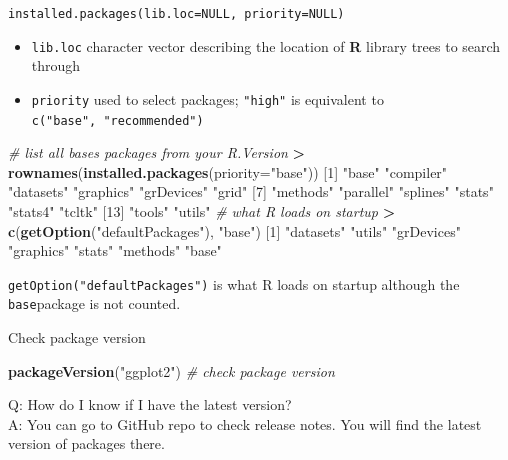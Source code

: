 \documentclass[
]{book}
\newenvironment{Shaded}{\begin{snugshade}}{\end{snugshade}}
\newcommand{\AttributeTok}[1]{\textcolor[rgb]{0.13,0.29,0.53}{#1}}
\newcommand{\CommentTok}[1]{\textcolor[rgb]{0.56,0.35,0.01}{\textit{#1}}}
\newcommand{\DecValTok}[1]{\textcolor[rgb]{0.00,0.00,0.81}{#1}}
\newcommand{\FunctionTok}[1]{\textcolor[rgb]{0.13,0.29,0.53}{\textbf{#1}}}
\newcommand{\NormalTok}[1]{#1}
\newcommand{\SpecialCharTok}[1]{\textcolor[rgb]{0.81,0.36,0.00}{\textbf{#1}}}
\newcommand{\StringTok}[1]{\textcolor[rgb]{0.31,0.60,0.02}{#1}}
\providecommand{\tightlist}{%
  \setlength{\itemsep}{0pt}\setlength{\parskip}{0pt}}
\theoremstyle{definition}
\theoremstyle{definition}
\theoremstyle{definition}
\theoremstyle{definition}
\theoremstyle{remark}
\begin{document}
\texttt{installed.packages(lib.loc=NULL,\ priority=NULL)}

\begin{itemize}
\tightlist
\item
  \texttt{lib.loc} character vector describing the location of \textbf{R} library trees to search through
\item
  \texttt{priority} used to select packages; \texttt{"high"} is equivalent to \texttt{c("base",\ "recommended")}
\end{itemize}

\begin{Shaded}
\begin{Highlighting}[]
\CommentTok{\# list all bases packages from your \textasciigrave{}R.Version\textasciigrave{}}
\SpecialCharTok{\textgreater{}} \FunctionTok{rownames}\NormalTok{(}\FunctionTok{installed.packages}\NormalTok{(}\AttributeTok{priority=}\StringTok{"base"}\NormalTok{))}
\NormalTok{ [}\DecValTok{1}\NormalTok{] }\StringTok{"base"}      \StringTok{"compiler"}  \StringTok{"datasets"}  \StringTok{"graphics"}  \StringTok{"grDevices"} \StringTok{"grid"}     
\NormalTok{ [}\DecValTok{7}\NormalTok{] }\StringTok{"methods"}   \StringTok{"parallel"}  \StringTok{"splines"}   \StringTok{"stats"}     \StringTok{"stats4"}    \StringTok{"tcltk"}    
\NormalTok{[}\DecValTok{13}\NormalTok{] }\StringTok{"tools"}     \StringTok{"utils"} 
\CommentTok{\#  what R loads on startup}
\SpecialCharTok{\textgreater{}} \FunctionTok{c}\NormalTok{(}\FunctionTok{getOption}\NormalTok{(}\StringTok{"defaultPackages"}\NormalTok{), }\StringTok{"base"}\NormalTok{)}
\NormalTok{[}\DecValTok{1}\NormalTok{] }\StringTok{"datasets"}  \StringTok{"utils"}     \StringTok{"grDevices"} \StringTok{"graphics"}  \StringTok{"stats"}     \StringTok{"methods"}   \StringTok{"base"}     
\end{Highlighting}
\end{Shaded}

\texttt{getOption("defaultPackages")} is what R loads on startup although the \texttt{base}package is not counted.

Check package version

\begin{Shaded}
\begin{Highlighting}[]
\FunctionTok{packageVersion}\NormalTok{(}\StringTok{"ggplot2"}\NormalTok{) }\CommentTok{\# check package version}
\end{Highlighting}
\end{Shaded}

Q: How do I know if I have the latest version?\\
A: You can go to GitHub repo to check release notes. You will find the latest version of packages there.
\end{document}
